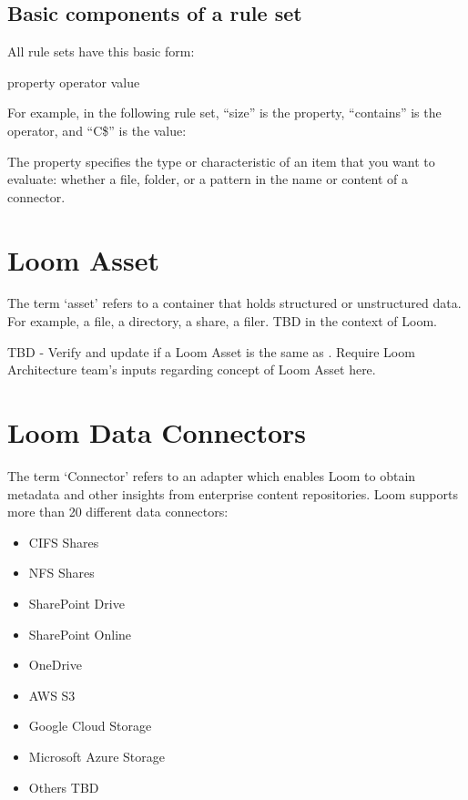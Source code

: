 \documentclass[letterpaper,10pt,english]{sphinxmanual}
\begin{document}
\subsection{Basic components of a rule set}
\label{\detokenize{mcdmp_concepts:basic-components-of-a-rule-set}}
All rule sets have this basic form:

property operator value

For example, in the following rule set, “size” is the property, “contains” is the operator, and “C\$” is the value:

The property specifies the type or characteristic of an item that you want to evaluate: whether a file, folder, or a pattern in the name or content of a connector.


\section{Loom Asset}
\label{\detokenize{mcdmp_concepts:term-loom-asset}}\label{\detokenize{mcdmp_concepts:loom-asset}}
The term ‘asset’ refers to a container that holds structured or unstructured data. For example, a file, a directory, a share, a filer.
TBD in the context of Loom.

TBD - Verify and update if a Loom Asset is the same as {\hyperref[\detokenize{mcdmp_concepts:term-info-asset}]{}}. Require Loom Architecture team’s inputs regarding concept of Loom Asset here.


\section{Loom Data Connectors}
\label{\detokenize{mcdmp_concepts:term-loom-connectors}}\label{\detokenize{mcdmp_concepts:loom-data-connectors}}
The term ‘Connector’ refers to an adapter which enables Loom to obtain metadata and other insights from enterprise content repositories. Loom supports more than 20 different data connectors:
\begin{itemize}
\item {} 
CIFS Shares

\item {} 
NFS Shares

\item {} 
SharePoint Drive

\item {} 
SharePoint Online

\item {} 
OneDrive

\item {} 
AWS S3

\item {} 
Google Cloud Storage

\item {} 
Microsoft Azure Storage

\item {} 
Others TBD

\end{itemize}
\end{document}
